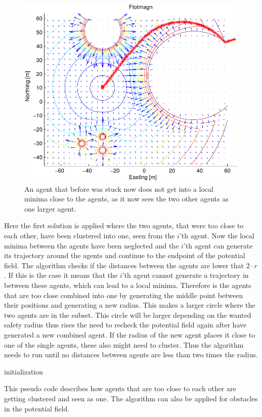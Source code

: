 \documentclass[a4paper,conference]{IEEEtran}
\begin{document}
\begin{figure}[htbp]
  \includegraphics[width=.9\linewidth]{fig/ftotmagnfigpdf4}
	\caption{An agent that before was stuck now does not get into a
		local minima close to the agents, as it now sees the two other
		agents as one larger agent.}
  \label{fig:solroevproblem}
\end{figure}

Here the first solution is applied where the two agents, that were too
close to each other, have been clustered into one, seen from the
$i$'th agent. Now the local minima between the agents have been
neglected and the $i$'th agent can generate its trajectory around the
agents and continue to the endpoint of the potential field. The
algorithm checks if the distances between the agents are lower that $2
\cdot r$. If this is the case it means that the $i$'th agent cannot
generate a trajectory in between these agents, which can lead to a
local minima. Therefore is the agents that are too close combined into
one by generating the middle point between their positions and
generating a new radius. This makes a larger circle where the two
agents are in the subset. This circle will be larger depending on the
wanted safety radius thus rises the need to recheck the potential
field again after have generated a new combined agent. If the radius
of the new agent places it close to one of the single agents, these
also might need to cluster. Thus the algorithm needs to run until no
distances between agents are less than two times the radius.

\begin{algorithm}[h]
  initialization\;
	\caption{This pseudo code describes how agents that are too close to
		each other are getting clustered and seen as one. The algorithm
		can also be applied for obstacles in the potential
		field.}
  \label{al:clusteragents}
\end{algorithm}
\end{document}
